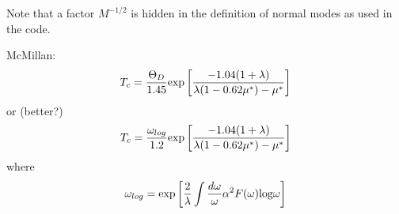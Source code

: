 \documentclass[12pt,a4paper]{article}
\begin{document}
Note that a factor $M^{-1/2}$ is hidden in the definition of
normal modes as used in the code.

McMillan:
\begin{equation}
T_c = {\Theta_D \over 1.45} \mbox{exp} \left [ 
         {-1.04(1+\lambda)\over \lambda(1-0.62\mu^*)-\mu^*}\right ]
\end{equation}
or (better?)
\begin{equation}
T_c = {\omega_{log}\over 1.2} \mbox{exp} \left [ 
         {-1.04(1+\lambda)\over \lambda(1-0.62\mu^*)-\mu^*}\right ]
\end{equation}
where
\begin{equation}
\omega_{log} = \mbox{exp} \left [ {2\over\lambda} \int {d\omega\over\omega}
                                  \alpha^2F(\omega) \mbox{log}\omega \right ]
\end{equation}
\end{document}
